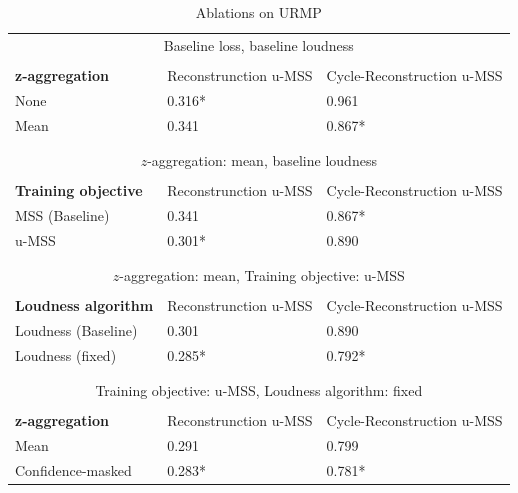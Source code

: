 \begin{table}
    \begin{tabular}{lll}
        \multicolumn{3}{c}{Baseline loss, baseline loudness} \\
        \\
        \textbf{z-aggregation} & Reconstrunction u-MSS & Cycle-Reconstruction u-MSS \\
        None  & 0.316* & 0.961 \\
        Mean & 0.341	& 0.867* \\
        \hline
        \\
        \\
        \multicolumn{3}{c}{$z$-aggregation: mean, baseline loudness} \\
        \\
        \textbf{Training objective} & Reconstrunction u-MSS & Cycle-Reconstruction u-MSS \\
        MSS (Baseline) & 0.341 & 0.867* \\
        u-MSS & 0.301* & 0.890 \\
        \hline
        \\
        \\
        \multicolumn{3}{c}{$z$-aggregation: mean, Training objective: u-MSS} \\
        \\
        \textbf{Loudness algorithm} & Reconstrunction u-MSS & Cycle-Reconstruction u-MSS \\
        Loudness (Baseline) & 0.301 & 0.890 \\
        Loudness (fixed) & 0.285* & 0.792* \\
        \hline
        \\
        \\
        \multicolumn{3}{c}{Training objective: u-MSS, Loudness algorithm: fixed} \\
        \\
        \textbf{z-aggregation} & Reconstrunction u-MSS & Cycle-Reconstruction u-MSS \\
        Mean & 0.291 & 0.799 \\
        Confidence-masked & 0.283* & 0.781* \\
        \hline
    \end{tabular}
    \caption{Ablations on URMP}
    \label{tab:ablations-urmp}
\end{table}

